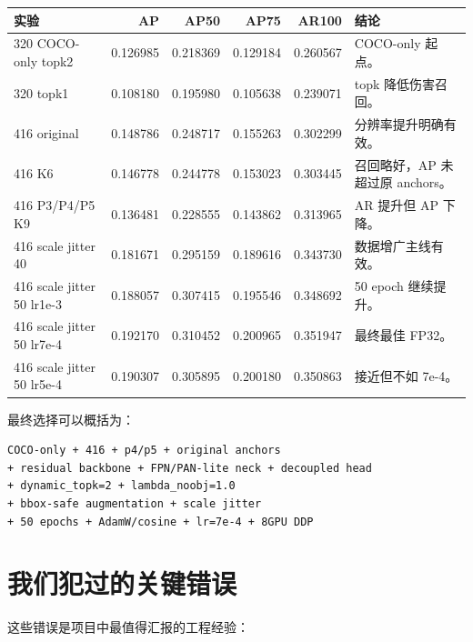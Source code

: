 \documentclass[11pt,a4paper]{article}
\begin{document}
\begin{longtable}{p{}rrrrp{}}
\toprule
实验 & AP & AP50 & AP75 & AR100 & 结论 \\
\midrule
320 COCO-only topk2 & 0.126985 & 0.218369 & 0.129184 & 0.260567 & COCO-only 起点。\\
320 topk1 & 0.108180 & 0.195980 & 0.105638 & 0.239071 & topk 降低伤害召回。\\
416 original & 0.148786 & 0.248717 & 0.155263 & 0.302299 & 分辨率提升明确有效。\\
416 K6 & 0.146778 & 0.244778 & 0.153023 & 0.303445 & 召回略好，AP 未超过原 anchors。\\
416 P3/P4/P5 K9 & 0.136481 & 0.228555 & 0.143862 & 0.313965 & AR 提升但 AP 下降。\\
416 scale jitter 40 & 0.181671 & 0.295159 & 0.189616 & 0.343730 & 数据增广主线有效。\\
416 scale jitter 50 lr1e-3 & 0.188057 & 0.307415 & 0.195546 & 0.348692 & 50 epoch 继续提升。\\
416 scale jitter 50 lr7e-4 & 0.192170 & 0.310452 & 0.200965 & 0.351947 & 最终最佳 FP32。\\
416 scale jitter 50 lr5e-4 & 0.190307 & 0.305895 & 0.200180 & 0.350863 & 接近但不如 7e-4。\\
\bottomrule
\end{longtable}

最终选择可以概括为：

\begin{Verbatim}[fontsize=\small]
COCO-only + 416 + p4/p5 + original anchors
+ residual backbone + FPN/PAN-lite neck + decoupled head
+ dynamic_topk=2 + lambda_noobj=1.0
+ bbox-safe augmentation + scale jitter
+ 50 epochs + AdamW/cosine + lr=7e-4 + 8GPU DDP
\end{Verbatim}

\section{我们犯过的关键错误}

这些错误是项目中最值得汇报的工程经验：
\end{document}
